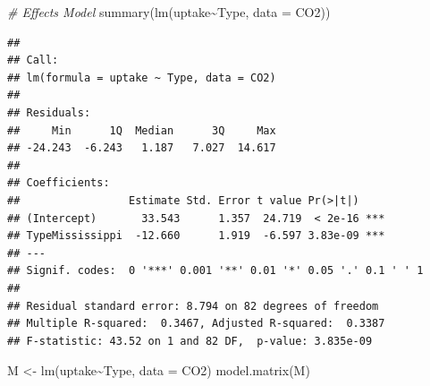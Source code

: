 \documentclass[
]{book}
\newenvironment{Shaded}{\begin{snugshade}}{\end{snugshade}}
\newcommand{\AttributeTok}[1]{\textcolor[rgb]{0.77,0.63,0.00}{#1}}
\newcommand{\CommentTok}[1]{\textcolor[rgb]{0.56,0.35,0.01}{\textit{#1}}}
\newcommand{\FunctionTok}[1]{\textcolor[rgb]{0.00,0.00,0.00}{#1}}
\newcommand{\NormalTok}[1]{#1}
\newcommand{\OtherTok}[1]{\textcolor[rgb]{0.56,0.35,0.01}{#1}}
\newcommand{\SpecialCharTok}[1]{\textcolor[rgb]{0.00,0.00,0.00}{#1}}
\begin{document}
\begin{Shaded}
\begin{Highlighting}[]
\CommentTok{\# Effects Model}
\FunctionTok{summary}\NormalTok{(}\FunctionTok{lm}\NormalTok{(uptake}\SpecialCharTok{\textasciitilde{}}\NormalTok{Type, }\AttributeTok{data =}\NormalTok{ CO2))}
\end{Highlighting}
\end{Shaded}

\begin{verbatim}
## 
## Call:
## lm(formula = uptake ~ Type, data = CO2)
## 
## Residuals:
##     Min      1Q  Median      3Q     Max 
## -24.243  -6.243   1.187   7.027  14.617 
## 
## Coefficients:
##                 Estimate Std. Error t value Pr(>|t|)    
## (Intercept)       33.543      1.357  24.719  < 2e-16 ***
## TypeMississippi  -12.660      1.919  -6.597 3.83e-09 ***
## ---
## Signif. codes:  0 '***' 0.001 '**' 0.01 '*' 0.05 '.' 0.1 ' ' 1
## 
## Residual standard error: 8.794 on 82 degrees of freedom
## Multiple R-squared:  0.3467, Adjusted R-squared:  0.3387 
## F-statistic: 43.52 on 1 and 82 DF,  p-value: 3.835e-09
\end{verbatim}

\begin{Shaded}
\begin{Highlighting}[]
\NormalTok{M }\OtherTok{\textless{}{-}} \FunctionTok{lm}\NormalTok{(uptake}\SpecialCharTok{\textasciitilde{}}\NormalTok{Type, }\AttributeTok{data =}\NormalTok{ CO2)}
\FunctionTok{model.matrix}\NormalTok{(M)}
\end{Highlighting}
\end{Shaded}
\end{document}
